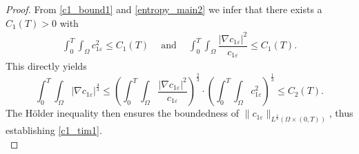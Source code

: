 \documentclass[10pt,a4paper]{amsart}
\begin{document}
\begin{proof}
  From \eqref{c1_bound1} and \eqref{entropy_main2} we infer that there exists a $C_1(T) > 0$ with
  \begin{align*}
    \int_0^{T} \int_\Omega c_{1\varepsilon}^2 \leq C_1(T) \quad ~\text{and}~ \quad \int_0^T \int_\Omega \dfrac{|\nabla c_{1 \varepsilon}|^2}{c_{1\varepsilon}} \leq C_1(T).
  \end{align*}
  This directly yields
  \begin{equation}
    \label{c1_tres1}
    \int_0^T \int_\Omega |\nabla c_{1\varepsilon}|^{\frac{4}{3}} \leq \left(\int_0^T \int_\Omega \dfrac{|\nabla c_{1 \varepsilon}|^2}{c_{1\varepsilon}}\right)^{\frac{2}{3}} \cdot  \left( \int_0^{T} \int_\Omega c_{1\varepsilon}^2 \right)^{\frac{1}{3}} \leq C_2(T).
  \end{equation}
  The H\"{o}lder inequality then ensures the boundedness of $\|c_{1\varepsilon}\|_{L^{\frac{4}{3}}(\Omega \times (0, T))}$, thus establishing \eqref{c1_tim1}.\\[-2ex]
  

\end{proof}
\end{document}
